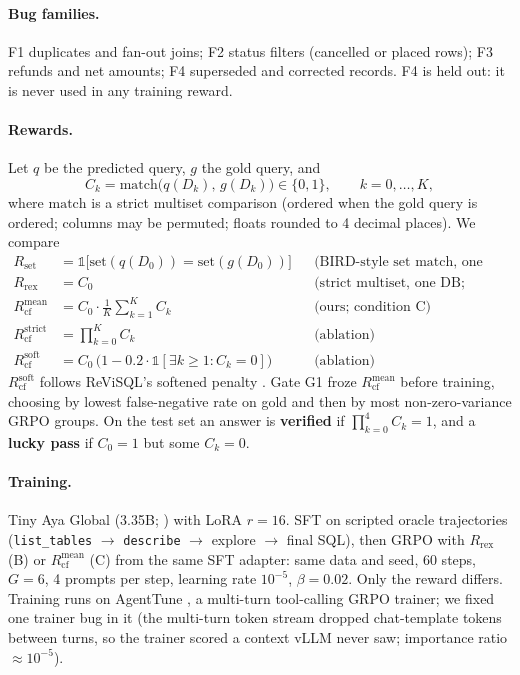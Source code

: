 \documentclass{article}
\newcommand{\Rset}{R_{\mathrm{set}}}
\newcommand{\Rrex}{R_{\mathrm{rex}}}
\newcommand{\Rcf}{R_{\mathrm{cf}}}
\newcommand{\code}[1]{\texttt{#1}}
\begin{document}
\paragraph{Bug families.} F1 duplicates and fan-out joins; F2 status filters (cancelled or placed rows); F3 refunds and net amounts; F4 superseded and corrected records. F4 is held out: it is never used in any training reward.

\paragraph{Rewards.} Let $q$ be the predicted query, $g$ the gold query, and
\begin{equation}
C_k = \mathrm{match}\big(q(D_k),\, g(D_k)\big) \in \{0,1\}, \qquad k = 0,\dots,K,
\end{equation}
where $\mathrm{match}$ is a strict multiset comparison (ordered when the gold query is ordered; columns may be permuted; floats rounded to 4 decimal places). We compare
\begin{align}
\Rset &= \mathbb{1}\big[\mathrm{set}(q(D_0)) = \mathrm{set}(g(D_0))\big] && \text{(BIRD-style set match, one DB)}\\
\Rrex &= C_0 && \text{(strict multiset, one DB; condition B)}\\
\Rcf^{\mathrm{mean}} &= C_0 \cdot \tfrac{1}{K}\textstyle\sum_{k=1}^{K} C_k && \text{(ours; condition C)}\\
\Rcf^{\mathrm{strict}} &= \textstyle\prod_{k=0}^{K} C_k && \text{(ablation)}\\
\Rcf^{\mathrm{soft}} &= C_0\,\big(1 - 0.2\cdot\mathbb{1}[\exists k \ge 1 : C_k = 0]\big) && \text{(ablation)}
\end{align}
$\Rcf^{\mathrm{soft}}$ follows ReViSQL's softened penalty \citep{revisql2026}. Gate G1 froze $\Rcf^{\mathrm{mean}}$ before training, choosing by lowest false-negative rate on gold and then by most non-zero-variance GRPO groups. On the test set an answer is \textbf{verified} if $\prod_{k=0}^{4} C_k = 1$, and a \textbf{lucky pass} if $C_0 = 1$ but some $C_k = 0$.

\paragraph{Training.} Tiny Aya Global (3.35B; \citealp{tinyaya2026}) with LoRA $r = 16$. SFT on scripted oracle trajectories (\code{list\_tables} $\to$ \code{describe} $\to$ explore $\to$ final SQL), then GRPO with $\Rrex$ (B) or $\Rcf^{\mathrm{mean}}$ (C) from the same SFT adapter: same data and seed, 60 steps, $G = 6$, 4 prompts per step, learning rate $10^{-5}$, $\beta = 0.02$. Only the reward differs. Training runs on AgentTune \citep{agenttune2026}, a multi-turn tool-calling GRPO trainer; we fixed one trainer bug in it (the multi-turn token stream dropped chat-template tokens between turns, so the trainer scored a context vLLM never saw; importance ratio $\approx 10^{-5}$).
\end{document}
